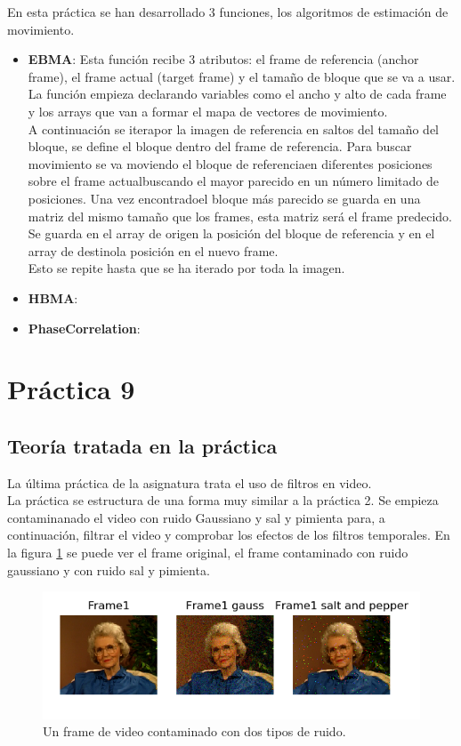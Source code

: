 \documentclass[a4paper,12pt]{report}
\begin{document}
En esta práctica se han desarrollado 3 funciones, los algoritmos de estimación de movimiento.\\

\begin{itemize}
	\item \textbf{ EBMA}: Esta función recibe 3 atributos: el frame de referencia (anchor frame), el frame actual (target frame) y el tamaño de bloque que se va a usar. La función empieza declarando variables como el ancho y alto de cada frame y los arrays que van a formar el mapa de vectores de movimiento.\\
A continuación se iterapor la imagen de referencia en saltos del tamaño del bloque, se define el bloque dentro del frame de referencia. Para buscar movimiento se va moviendo el bloque de referenciaen diferentes posiciones sobre el frame actualbuscando el mayor parecido en un número limitado de posiciones. Una vez encontradoel bloque más parecido se guarda en una matriz del mismo tamaño que los frames, esta matriz será el frame predecido. Se guarda en el array de origen la posición del bloque de referencia y en el array de destinola posición en el nuevo frame.\\
Esto se repite hasta que se ha iterado por toda la imagen.
	\item \textbf{ HBMA}:
	\item \textbf{PhaseCorrelation}:
\end{itemize}

\section{ Práctica 9}
\subsection{Teoría tratada en la práctica}

La última práctica de la asignatura trata el uso de filtros en video.\\

La práctica se estructura de una forma muy similar a la práctica 2. Se empieza contaminanado el video con ruido Gaussiano y sal y pimienta para, a continuación, filtrar el video y comprobar los efectos de los filtros temporales. En la figura \ref{ruidovideo} se puede ver el frame original, el frame contaminado con ruido gaussiano y con ruido sal y pimienta.\\
\begin{figure}[h]
\centering
\includegraphics[width=1.0\textwidth]{imagenes/ruidovideo}
\caption{Un frame de video contaminado con dos tipos de ruido.}
\label{ruidovideo} 
\end{figure}
\end{document}
